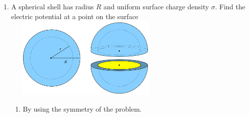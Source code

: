 \documentclass[fleqn]{article}
\begin{document}
\begin{enumerate}
\begin{enumerate}
    \end{enumerate}


    \item A spherical shell has radius $R$ and uniform surface charge density $\sigma$. Find the electric potential 
    at a point on the surface
    \\
    \includegraphics[height=4cm, width=8cm]{Eight.jpg}

    \begin{enumerate}
      \item By using the symmetry of the problem.


\end{enumerate}
\end{enumerate}
\end{document}
